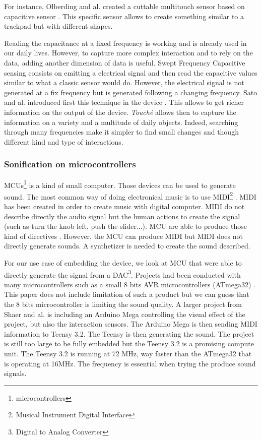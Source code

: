 For instance, Olberding and al. created a cuttable multitouch sensor based on capacitive sensor \cite{olberdingCuttableMultitouchSensor2013}.
This specific sensor allows to create something similar to a trackpad but with different shapes.

Reading the capacitance at a fixed frequency is working and is already used in our daily lives. 
However, to capture more complex interaction and to rely on the data, adding another dimension of data is useful.
Swept Frequency Capacitive sensing consists on emitting a electrical signal and then read the capacitive values
similar to what a classic sensor would do. However, the electrical signal is not generated at a fix frequency
but is generated following a changing frequency. 
Sato and al. introduced first this technique in the  device \cite{satoToucheEnhancingTouch2012}.
This allows to get richer information on the output of the device. \textit{Touché} allows then to capture 
the information on a variety and a multitude of daily objects.
Indeed, searching through many frequencies make it simpler to find small changes and though different kind and type 
of interactions.

\subsubsection{Sonification on microcontrollers}

MCUs\footnote{microcontrollers} \cite{rochim2019design} is a kind of small computer.
Those devices can be used to generate sound. The most common way of doing electronical music
is to use MIDI\footnote{Musical Instrument Digital Interface} \cite{loyMusiciansMakeStandard1985}.
MIDI has been created in order to create music with digital computer. MIDI do not describe directly 
the audio signal but the human actions to create the signal (such as turn the knob left, push the slider...).
MCU are able to produce those kind of directives \cite{fazendaProceedingsInternationalConference1}\cite{fazendaProceedingsInternationalConference2}.
However, the MCU can produce MIDI but MIDI does not directly generate sounds. A synthetizer is needed to create the sound
described.

For our use case of embedding the device, we look at MCU that were able to directly generate the signal 
from a DAC\footnote{Digital to Analog Converter}. Projects had been conducted with many microcontrollers such as a small
8 bits AVR microcontrollers (ATmega32) \cite{hussainAVRMicrocontrollerImplementation2011}. This paper does not include limitation of
such a product but we can guess that the 8 bits microcontroller is limiting the sound quality. A larger project from Shaer and al.
\cite{shaerInteractiveCapacitiveTouch2020} is including an Arduino Mega controlling the visual effect of the project,
but also the interaction sensors. The Arduino Mega is then sending MIDI information to Teensy 3.2. The Teensy is then 
generating the sound. The project is still too large to be fully embedded but the Teensy 3.2 is a promising compute unit.
The Teensy 3.2 is running at 72 MHz, way faster than the ATmega32 that is operating at 16MHz. The frequency is essential
when trying the produce sound signals.


